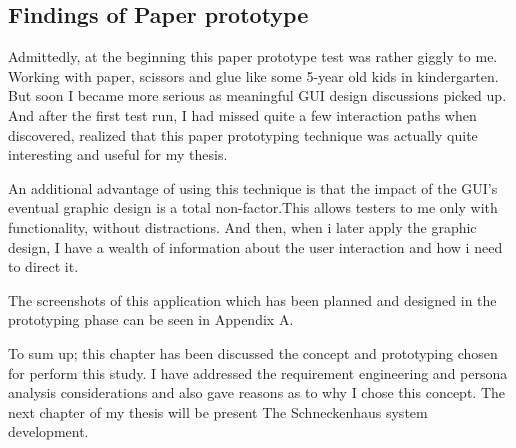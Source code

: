 \subsection*{Findings of Paper prototype} \label{Findings of Paper prototype}

Admittedly, at the beginning this paper prototype test was rather giggly to me. Working with paper, scissors and glue like some 5-year old kids in kindergarten. But soon I became more serious as meaningful GUI design discussions picked up. And after the first test run, I had missed quite a few interaction paths when discovered, realized that this paper prototyping technique was actually quite interesting and useful for my thesis.

An additional advantage of using this technique is that the impact of the GUI's eventual graphic design is a total non-factor.This allows testers to me only with functionality, without distractions. And then, when i later apply the graphic design, I have a wealth of information about the user interaction and how i need to direct it.

The screenshots of this application which has been planned and designed in the prototyping phase can be seen in Appendix A.


To sum up; this chapter has been discussed the concept and prototyping chosen for perform this study. I have addressed the requirement engineering and persona analysis considerations and also gave reasons as to why I chose this concept. The next chapter of my thesis will be present The Schneckenhaus system development. 


